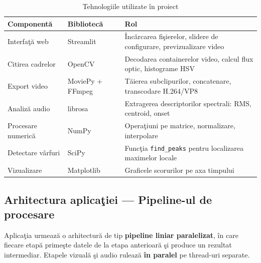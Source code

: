 \documentclass[12pt,a4paper]{article}
\begin{document}
\begin{table}[H]
\centering
\caption{Tehnologiile utilizate \^{i}n proiect}
\label{tab:tech}
\begin{tabular}{l l p{7cm}}
\toprule
\textbf{Component\u{a}} & \textbf{Bibliotec\u{a}} & \textbf{Rol} \\
\midrule
Interfa\c{t}\u{a}{} web & Streamlit \cite{streamlit2026} & \^{I}nc\u{a}rcarea fi\c{s}ierelor, slidere de configurare, previzualizare video \\
Citirea cadrelor & OpenCV \cite{opencv2000} & Decodarea containerelor video, calcul flux optic, histograme HSV \\
Export video & MoviePy + FFmpeg \cite{moviepy2015} & T\u{a}ierea subclipurilor, concatenare, transcodare H.264/VP8 \\
Analiz\u{a}{} audio & librosa \cite{librosa2015} & Extragerea descriptorilor spectrali: RMS, centroid, onset \\
Procesare numeric\u{a}& NumPy & Opera\c{t}iuni pe matrice, normalizare, interpolare \\
Detectare v\^{a}rfuri & SciPy & Func\c{t}ia \texttt{find\_peaks} pentru localizarea maximelor locale \\
Vizualizare & Matplotlib & Graficele scorurilor pe axa timpului \\
\bottomrule
\end{tabular}
\end{table}

\subsection{Arhitectura aplica\c{t}iei --- Pipeline-ul de procesare}

Aplica\c{t}ia urmeaz\u{a}{} o arhitectur\u{a}{} de tip \textbf{pipeline liniar paralelizat}, \^{i}n care fiecare etap\u{a}{} prime\c{s}te datele de la etapa anterioar\u{a}{} \c{s}i produce un rezultat intermediar. Etapele vizual\u{a}{} \c{s}i audio ruleaz\u{a}{} \textbf{\^{i}n paralel} pe thread-uri separate.
\end{document}
